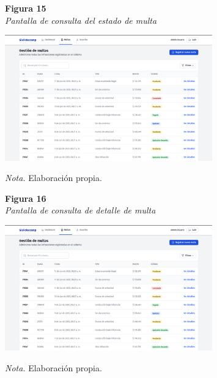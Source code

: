 \begin{figure}[htbp]
    \begin{flushleft}
        \textbf{Figura 15}\\
        \textit{Pantalla de consulta del estado de multa}
    \end{flushleft}
    \centering
    \includegraphics[width=0.8\textwidth]{Images/UI4.png}
    \vspace{0.5em}
    \begin{flushleft}
        \textit{Nota.} Elaboración propia.
    \end{flushleft}
    \label{fig:consulta_estado_multa}
\end{figure}

\begin{figure}[htbp]
    \begin{flushleft}
        \textbf{Figura 16}\\
        \textit{Pantalla de consulta de detalle de multa}
    \end{flushleft}
    \centering
    \includegraphics[width=0.8\textwidth]{Images/UI4.png}
    \vspace{0.5em}
    \begin{flushleft}
        \textit{Nota.} Elaboración propia.
    \end{flushleft}
    \label{fig:consulta_detalle_multa}
\end{figure}

